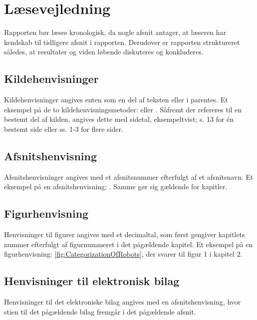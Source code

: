 \section*{Læsevejledning}
\label{Laesevejledning}
Rapporten bør læses kronologisk, da nogle afsnit antager, at læseren har kendskab til tidligere afsnit i rapporten. Derudover er rapporten struktureret således, at resultater og viden løbende diskuteres og konkluderes.
%
\subsection*{Kildehenvisninger}
Kildehenvisninger angives enten som en del af teksten eller i parentes. Et eksempel på de to kildehenvisningsmetoder: \textcite[s. 13]{PDF:RobotShiftFromIPtoSR} eller \parencite[s. 13]{PDF:RobotShiftFromIPtoSR}. Såfremt der refereres til en bestemt del af kilden, angives dette med sidetal, eksempeltvist; s. 13 for én bestemt side eller ss. 1-3 for flere sider.
%
\subsection*{Afsnitshenvisning}
Afsnitshenvisninger angives med et afsnitsnummer efterfulgt af et afsnitsnavn. Et eksempel på en afsnitshenvisning: . Samme gør sig gældende for kapitler.
%
\subsection*{Figurhenvisning}
Henvisninger til figurer angives med et decimaltal, som først gengiver kapitlets nummer efterfulgt af figurnummeret i det pågældende kapitel. Et eksempel på en figurhenvisning: \autoref{fig:CategorizationOfRobots}, der svarer til figur 1 i kapitel 2. 
%
\subsection*{Henvisninger til elektronisk bilag}
Henvisninger til det elektroniske bilag angives med en afsnitshenvisning, hvor stien til det pågældende bilag fremgår i det pågældende afsnit. 